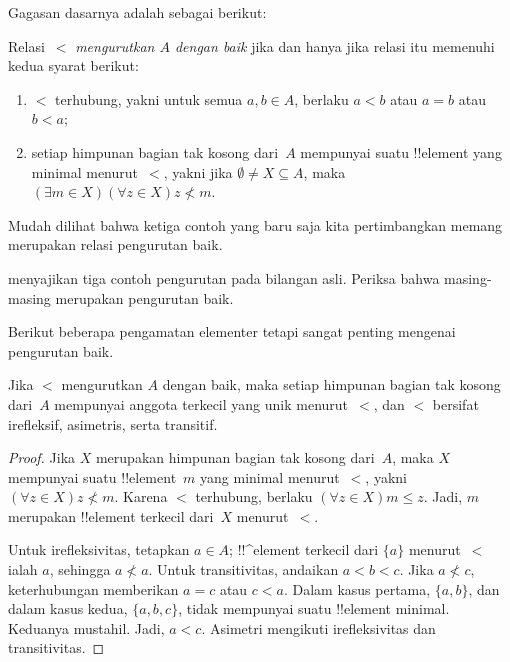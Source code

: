 \documentclass[../../../include/open-logic-section]{subfiles}
\begin{document}

Gagasan dasarnya adalah sebagai berikut:

\begin{defn}
Relasi~$<$ \emph{mengurutkan $A$ dengan baik} jika dan hanya jika relasi itu
memenuhi kedua syarat berikut:
\begin{enumerate}
	\item $<$ terhubung, yakni untuk semua $a,b\in A$, berlaku $a<b$ atau
	$a=b$ atau $b<a$;
	\item setiap himpunan bagian tak kosong dari~$A$ mempunyai suatu
	!!{element} yang minimal menurut~$<$, yakni jika
	$\emptyset\neq X\subseteq A$, maka
	$(\exists m\in X)(\forall z\in X)z\nless m$.
\end{enumerate}
\end{defn}

Mudah dilihat bahwa ketiga contoh yang baru saja kita pertimbangkan memang
merupakan relasi pengurutan baik.

\begin{prob}
 menyajikan tiga contoh pengurutan pada
bilangan asli. Periksa bahwa masing-masing merupakan pengurutan baik.
\end{prob}

Berikut beberapa pengamatan elementer tetapi sangat penting mengenai
pengurutan baik.

\begin{prop}
Jika $<$ mengurutkan $A$ dengan baik, maka setiap himpunan bagian tak kosong
dari~$A$ mempunyai anggota terkecil yang unik menurut~$<$, dan $<$ bersifat
irefleksif, asimetris, serta transitif.
\end{prop}

\begin{proof}
Jika $X$ merupakan himpunan bagian tak kosong dari~$A$, maka $X$ mempunyai
suatu !!{element}~$m$ yang minimal menurut~$<$, yakni
$(\forall z\in X)z\nless m$. Karena $<$ terhubung, berlaku
$(\forall z\in X)m\leq z$. Jadi, $m$ merupakan !!{element} terkecil dari~$X$
menurut~$<$.

Untuk irefleksivitas, tetapkan $a\in A$; !!^{element} terkecil dari $\{a\}$
menurut~$<$ ialah $a$, sehingga $a\nless a$. Untuk transitivitas, andaikan
$a<b<c$. Jika $a\nless c$, keterhubungan memberikan $a=c$ atau $c<a$.
  Dalam kasus pertama, $\{a,b\}$, dan dalam kasus kedua, $\{a,b,c\}$, tidak
  mempunyai suatu !!{element} minimal. Keduanya mustahil. Jadi,
$a<c$. Asimetri mengikuti irefleksivitas dan transitivitas.
\end{proof}
\end{document}
